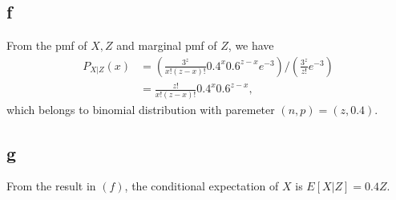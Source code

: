 \documentclass[12pt,letterpaper]{article}
\begin{document}
    \subsection*{f}
        From the pmf of $X, Z$ and marginal pmf of $Z$, we have
        \begin{equation*}
            \begin{aligned}
                P_{X | Z}(x) &= (\frac{3^{z}}{x!(z - x)!} 0.4^{x} 0.6^{z - x} e^{-3}) / (\frac{3^{z}}{z!}e^{-3}) \\
                &= \frac{z!}{x!(z - x)!} 0.4^{x} 0.6^{z - x},
            \end{aligned}
        \end{equation*}
        which belongs to binomial distribution with paremeter $(n, p) = (z, 0.4)$.
    \subsection*{g}
        From the result in $(f)$, the conditional expectation of $X$ is $E[X | Z] = 0.4Z$.
\end{document}
